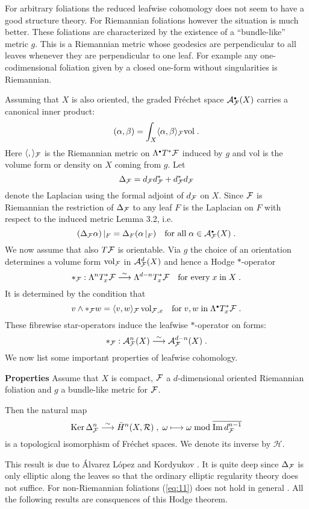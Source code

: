 \documentclass[11pt,leqno]{article}
\newcommand{\Imm}{\mathrm{Im}\,}
\newcommand{\Ker}{\mathrm{Ker}\,}
\newcommand{\vol}{\mathrm{vol}}
\newcommand{\Ah}{{\cal A}}
\newcommand{\Fh}{{\cal F}}
\newcommand{\Hh}{{\mathcal H}}
\newcommand{\Rh}{{\cal R}}
\newcommand{\oH}{\bar{H}}
\newcommand{\silo}{\stackrel{\sim}{\longrightarrow}}
\newcommand{\hullet}{{\scriptscriptstyle \bullet}}
\begin{document}
For arbitrary foliations the reduced leafwise cohomology does not seem to have a good structure theory. For Riemannian foliations however the situation is much better. These foliations are characterized by the existence of a ``bundle-like'' metric $g$. This is a Riemannian metric whose geodesics are perpendicular to all leaves whenever they are perpendicular to one leaf. For example any one-codimensional foliation given by a closed one-form without singularities is Riemannian. 

Assuming that $X$ is also oriented, the graded Fr\'echet space $\Ah^{\hullet}_{\Fh} (X)$ carries a canonical inner product:
\[
(\alpha , \beta) = \int_X \langle \alpha , \beta \rangle_{\Fh} \vol \; .
\]
Here $\langle , \rangle_{\Fh}$ is the Riemannian metric on $\Lambda^{\hullet} T^* \Fh$ induced by $g$ and $\vol$ is the volume form or density on $X$ coming from $g$. Let
\[
\Delta_{\Fh} = d_{\Fh} d^*_{\Fh} + d^*_{\Fh} d_{\Fh}
\]
denote the Laplacian using the formal adjoint of $d_{\Fh}$ on $X$. Since $\Fh$ is Riemannian the restriction of $\Delta_{\Fh}$ to any leaf $F$ is the Laplacian on $F$ with respect to the induced metric \cite{AK1} Lemma 3.2, i.e.
\[
(\Delta_{\Fh} \alpha) \, |_F = \Delta_F (\alpha \, |_F) \quad \mbox{for all} \; \alpha \in \Ah^{\hullet}_{\Fh} (X) \; .
\]
We now assume that also $T \Fh$ is orientable. Via $g$ the choice of an orientation determines a volume form $\vol_{\Fh}$ in $\Ah^d_{\Fh} (X)$ and hence a Hodge $*$-operator
\[
*_{\Fh} : \Lambda^n T^*_x \Fh \silo \Lambda^{d-n} T^*_x \Fh \quad \mbox{for every} \; x \; \mbox{in} \; X \; .
\]
It is determined by the condition that
\[
v \wedge *_{\Fh} w = \langle v,w \rangle_{\Fh} \, \vol_{\Fh , x} \quad \mbox{for} \; v,w \; \mbox{in} \; \Lambda^{\hullet} T^*_x \Fh \; .
\]
These fibrewise star-operators induce the leafwise $*$-operator on forms:
\[
*_{\Fh} : \Ah^n_{\Fh} (X) \silo \Ah^{d-n}_{\Fh} (X) \; .
\]
We now list some important properties of leafwise cohomology.

{\bf Properties} Assume that $X$ is compact, $\Fh$ a $d$-dimensional oriented Riemannian foliation and $g$ a bundle-like metric for $\Fh$.

Then the natural map
\begin{equation}
  \label{eq:11}
  \Ker \Delta^n_{\Fh} \silo \oH^n (X , \Rh ) \; ,\; \omega \longmapsto \omega \bmod \overline{\Imm d^{n-1}_{\Fh}}
\end{equation}
is a topological isomorphism of Fr\'echet spaces. We denote its inverse by $\Hh$.

This result is due to \'Alvarez L\'opez and Kordyukov \cite{AK1}. It is quite deep since $\Delta_{\Fh}$ is only elliptic along the leaves so that the ordinary elliptic regularity theory does not suffice. For non-Riemannian foliations (\ref{eq:11}) does not hold in general \cite{DS1}. All the following results are consquences of this Hodge theorem.
\end{document}

